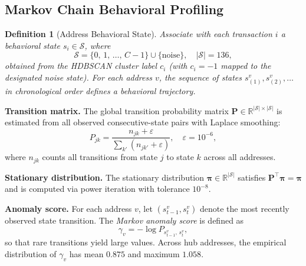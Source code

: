 \documentclass[journal]{IEEEtran}
\newtheorem{definition}{Definition}
\begin{document}
\subsection{Markov Chain Behavioral Profiling}
\label{subsec:markov}

\begin{definition}[Address Behavioral State]
\label{def:markov}
Associate with each transaction $i$ a \emph{behavioral state}
$s_{i}\in\mathcal{S}$, where
\begin{equation}
  \mathcal{S}
    = \{0,\,1,\,\ldots,\,C-1\} \cup \{\text{noise}\},
  \quad |\mathcal{S}| = 136,
  \label{eq:statespace}
\end{equation}
obtained from the HDBSCAN cluster label $c_{i}$ (with $c_{i}=-1$ mapped
to the designated noise state).
For each address $v$, the sequence of states
$s_{(1)}^{v}, s_{(2)}^{v}, \ldots$ in chronological order defines a
\emph{behavioral trajectory}.
\end{definition}

\noindent\textbf{Transition matrix.}
The global transition probability matrix
$\mathbf{P}\in\mathbb{R}^{|\mathcal{S}|\times|\mathcal{S}|}$
is estimated from all observed consecutive-state pairs with Laplace smoothing:
\begin{equation}
  P_{jk}
    = \frac{n_{jk} + \varepsilon}{\displaystyle\sum_{k'} (n_{jk'} + \varepsilon)},
  \quad \varepsilon = 10^{-6},
  \label{eq:transition}
\end{equation}
where $n_{jk}$ counts all transitions from state $j$ to state $k$ across all
addresses.

\noindent\textbf{Stationary distribution.}
The stationary distribution $\boldsymbol{\pi}\in\mathbb{R}^{|\mathcal{S}|}$
satisfies $\mathbf{P}^{\!\top}\boldsymbol{\pi} = \boldsymbol{\pi}$ and is
computed via power iteration with tolerance $10^{-8}$.

\noindent\textbf{Anomaly score.}
For each address $v$, let $(s_{t-1}^{v}, s_{t}^{v})$ denote the most recently
observed state transition.  The \emph{Markov anomaly score} is defined as
\begin{equation}
  \gamma_{v}
    = -\log P_{s_{t-1}^{v},\,s_{t}^{v}},
  \label{eq:markov_score}
\end{equation}
so that rare transitions yield large values.
Across hub addresses, the empirical distribution of $\gamma_{v}$ has mean
$0.875$ and maximum $1.058$.

\end{document}
